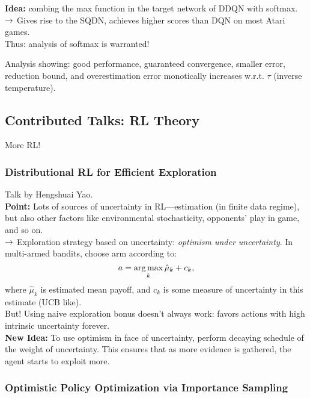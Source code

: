 {\bf Idea:} combing the max function in the target network of DDQN with softmax. \\

$\rightarrow$ Gives rise to the SQDN, achieves higher scores than DQN on most Atari games. \\

Thus: analysis of softmax is warranted! \\

\begin{theorem}
Analysis showing: good performance, guaranteed convergence, smaller error, reduction bound, and overestimation error monotically increases w.r.t. $\tau$ (inverse temperature).
\end{theorem}

\spacerule
\subsection{Contributed Talks: RL Theory}

More RL!

\subsubsection{Distributional RL for Efficient Exploration~\cite{mavrin2019distributional}}

Talk by Hengshuai Yao. \\

{\bf Point:} Lots of sources of uncertainty in RL---estimation (in finite data regime), but also other factors like environmental stochasticity, opponents' play in game, and so on. \\

$\rightarrow$ Exploration strategy based on uncertainty: {\it optimism under uncertainty}. In multi-armed bandits, choose arm according to:
\[
a = \operatorname*{arg\,max}_k \hat{\mu}_k + c_k,
\]
where $\hat{\mu}_k$ is estimated mean payoff, and $c_k$ is some measure of uncertainty in this estimate (UCB like). \\

But! Using naive exploration bonus doesn't always work: favors actions with high intrinsic uncertainty forever. \\

{\bf New Idea:} To use optimism in face of uncertainty, perform decaying schedule of the weight of uncertainty. This ensures that as more evidence is gathered, the agent starts to exploit more.
\spacerule

\subsubsection{Optimistic Policy Optimization via Importance Sampling~\cite{papini2019optimistic}}

